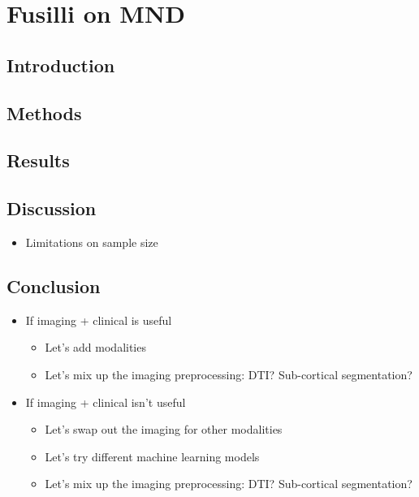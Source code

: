 \chapter{Fusilli on MND}
\label{fusilli_on_mnd}

\section{Introduction}

\section{Methods}

\section{Results}

\section{Discussion}
\begin{itemize}
    \item Limitations on sample size
\end{itemize}

\section{Conclusion}
\begin{itemize}
    \item If imaging + clinical is useful
    \begin{itemize}
        \item Let's add modalities
        \item Let's mix up the imaging preprocessing: DTI? Sub-cortical segmentation?
    \end{itemize}
    \item If imaging + clinical isn't useful
    \begin{itemize}
        \item Let's swap out the imaging for other modalities
        \item Let's try different machine learning models
        \item Let's mix up the imaging preprocessing: DTI? Sub-cortical segmentation?
    \end{itemize}
\end{itemize}
